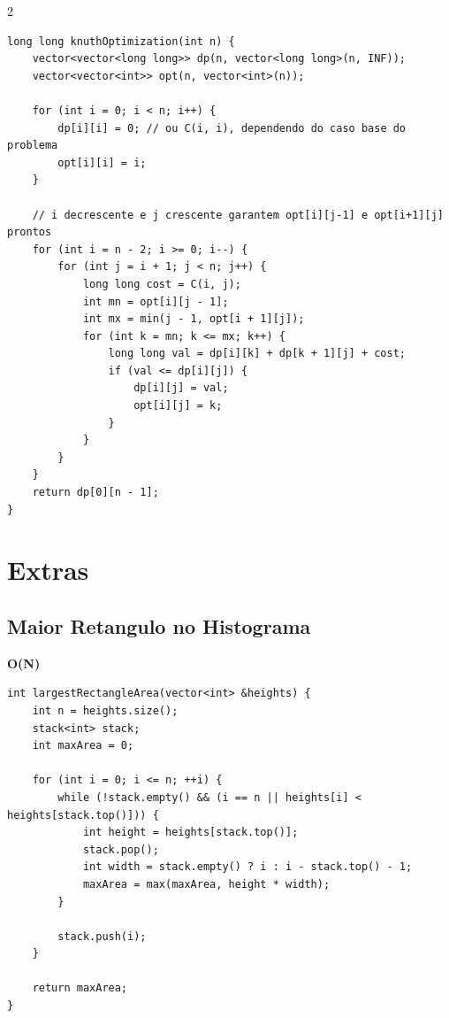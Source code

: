 \documentclass[11pt]{article}
\begin{document}
\begin{multicols}{2}
\begin{lstlisting}
long long knuthOptimization(int n) {
    vector<vector<long long>> dp(n, vector<long long>(n, INF));
    vector<vector<int>> opt(n, vector<int>(n));

    for (int i = 0; i < n; i++) {
        dp[i][i] = 0; // ou C(i, i), dependendo do caso base do problema
        opt[i][i] = i;
    }

    // i decrescente e j crescente garantem opt[i][j-1] e opt[i+1][j] prontos
    for (int i = n - 2; i >= 0; i--) {
        for (int j = i + 1; j < n; j++) {
            long long cost = C(i, j);
            int mn = opt[i][j - 1];
            int mx = min(j - 1, opt[i + 1][j]);
            for (int k = mn; k <= mx; k++) {
                long long val = dp[i][k] + dp[k + 1][j] + cost;
                if (val <= dp[i][j]) {
                    dp[i][j] = val;
                    opt[i][j] = k;
                }
            }
        }
    }
    return dp[0][n - 1];
}
\end{lstlisting}

\section{Extras}

\subsection{Maior Retangulo no Histograma}
\textbf{O(N)}
\begin{lstlisting}
int largestRectangleArea(vector<int> &heights) {
    int n = heights.size();
    stack<int> stack;
    int maxArea = 0;

    for (int i = 0; i <= n; ++i) {
        while (!stack.empty() && (i == n || heights[i] < heights[stack.top()])) {
            int height = heights[stack.top()];
            stack.pop();
            int width = stack.empty() ? i : i - stack.top() - 1;
            maxArea = max(maxArea, height * width);
        }

        stack.push(i);
    }

    return maxArea;
}
\end{lstlisting}

\end{multicols}
\end{document}
